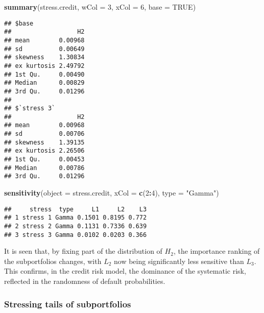 \documentclass[
]{article}
\newenvironment{Shaded}{\begin{snugshade}}{\end{snugshade}}
\newcommand{\DataTypeTok}[1]{\textcolor[rgb]{0.13,0.29,0.53}{#1}}
\newcommand{\DecValTok}[1]{\textcolor[rgb]{0.00,0.00,0.81}{#1}}
\newcommand{\KeywordTok}[1]{\textcolor[rgb]{0.13,0.29,0.53}{\textbf{#1}}}
\newcommand{\NormalTok}[1]{#1}
\newcommand{\OperatorTok}[1]{\textcolor[rgb]{0.81,0.36,0.00}{\textbf{#1}}}
\newcommand{\OtherTok}[1]{\textcolor[rgb]{0.56,0.35,0.01}{#1}}
\newcommand{\StringTok}[1]{\textcolor[rgb]{0.31,0.60,0.02}{#1}}
\begin{document}
\begin{Shaded}
\begin{Highlighting}[]
\KeywordTok{summary}\NormalTok{(stress.credit, }\DataTypeTok{wCol =} \DecValTok{3}\NormalTok{, }\DataTypeTok{xCol =} \DecValTok{6}\NormalTok{, }\DataTypeTok{base =} \OtherTok{TRUE}\NormalTok{)}
\end{Highlighting}
\end{Shaded}

\begin{verbatim}
## $base
##                  H2
## mean        0.00968
## sd          0.00649
## skewness    1.30834
## ex kurtosis 2.49792
## 1st Qu.     0.00490
## Median      0.00829
## 3rd Qu.     0.01296
## 
## $`stress 3`
##                  H2
## mean        0.00968
## sd          0.00706
## skewness    1.39135
## ex kurtosis 2.26506
## 1st Qu.     0.00453
## Median      0.00786
## 3rd Qu.     0.01296
\end{verbatim}

\begin{Shaded}
\begin{Highlighting}[]
\KeywordTok{sensitivity}\NormalTok{(}\DataTypeTok{object =}\NormalTok{ stress.credit, }\DataTypeTok{xCol =} \KeywordTok{c}\NormalTok{(}\DecValTok{2}\OperatorTok{:}\DecValTok{4}\NormalTok{), }\DataTypeTok{type =} \StringTok{"Gamma"}\NormalTok{)}
\end{Highlighting}
\end{Shaded}

\begin{verbatim}
##     stress  type     L1     L2    L3
## 1 stress 1 Gamma 0.1501 0.8195 0.772
## 2 stress 2 Gamma 0.1131 0.7336 0.639
## 3 stress 3 Gamma 0.0102 0.0203 0.366
\end{verbatim}

It is seen that, by fixing part of the distribution of \(H_2\), the importance ranking of the subportfolios changes, with \(L_2\) now being significantly less sensitive than \(L_3\). This confirms, in the credit risk model, the dominance of the systematic risk, reflected in the randomness of default probabilities.

\hypertarget{stressing-tails-of-subportfolios}{%
\subsubsection{Stressing tails of subportfolios}\label{stressing-tails-of-subportfolios}}
\end{document}

